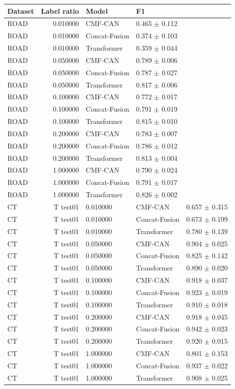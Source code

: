 \begin{tabular}{lrll}
\toprule
Dataset & Label ratio & Model & F1 \\
\midrule
ROAD & 0.010000 & CMF-CAN & 0.465 $\pm$ 0.112 \\
ROAD & 0.010000 & Concat-Fusion & 0.374 $\pm$ 0.103 \\
ROAD & 0.010000 & Transformer & 0.359 $\pm$ 0.044 \\
ROAD & 0.050000 & CMF-CAN & 0.789 $\pm$ 0.006 \\
ROAD & 0.050000 & Concat-Fusion & 0.787 $\pm$ 0.027 \\
ROAD & 0.050000 & Transformer & 0.817 $\pm$ 0.006 \\
ROAD & 0.100000 & CMF-CAN & 0.772 $\pm$ 0.017 \\
ROAD & 0.100000 & Concat-Fusion & 0.791 $\pm$ 0.019 \\
ROAD & 0.100000 & Transformer & 0.815 $\pm$ 0.010 \\
ROAD & 0.200000 & CMF-CAN & 0.783 $\pm$ 0.007 \\
ROAD & 0.200000 & Concat-Fusion & 0.786 $\pm$ 0.012 \\
ROAD & 0.200000 & Transformer & 0.813 $\pm$ 0.004 \\
ROAD & 1.000000 & CMF-CAN & 0.790 $\pm$ 0.024 \\
ROAD & 1.000000 & Concat-Fusion & 0.791 $\pm$ 0.017 \\
ROAD & 1.000000 & Transformer & 0.826 $\pm$ 0.002 \\
CT&T test01 & 0.010000 & CMF-CAN & 0.657 $\pm$ 0.315 \\
CT&T test01 & 0.010000 & Concat-Fusion & 0.673 $\pm$ 0.199 \\
CT&T test01 & 0.010000 & Transformer & 0.780 $\pm$ 0.139 \\
CT&T test01 & 0.050000 & CMF-CAN & 0.904 $\pm$ 0.025 \\
CT&T test01 & 0.050000 & Concat-Fusion & 0.825 $\pm$ 0.142 \\
CT&T test01 & 0.050000 & Transformer & 0.890 $\pm$ 0.020 \\
CT&T test01 & 0.100000 & CMF-CAN & 0.918 $\pm$ 0.037 \\
CT&T test01 & 0.100000 & Concat-Fusion & 0.923 $\pm$ 0.019 \\
CT&T test01 & 0.100000 & Transformer & 0.910 $\pm$ 0.018 \\
CT&T test01 & 0.200000 & CMF-CAN & 0.918 $\pm$ 0.045 \\
CT&T test01 & 0.200000 & Concat-Fusion & 0.942 $\pm$ 0.023 \\
CT&T test01 & 0.200000 & Transformer & 0.920 $\pm$ 0.015 \\
CT&T test01 & 1.000000 & CMF-CAN & 0.801 $\pm$ 0.153 \\
CT&T test01 & 1.000000 & Concat-Fusion & 0.937 $\pm$ 0.022 \\
CT&T test01 & 1.000000 & Transformer & 0.908 $\pm$ 0.025 \\
\bottomrule
\end{tabular}
